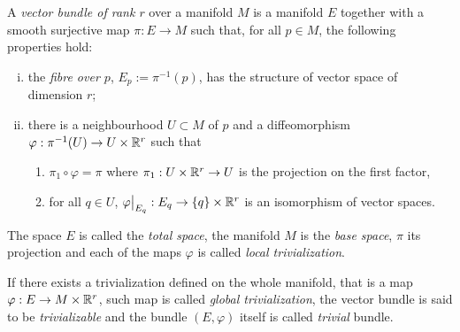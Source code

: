 \begin{definition}\label{def:vector_bundle}
	A \emph{vector bundle of rank $r$} over a manifold $M$ is a manifold $E$ together with a smooth surjective map $\pi : E \to M$ such that, for all $p\in M$, the following properties hold:
	\begin{enumerate}[(i)]
		\item the \emph{fibre over $p$}, $E_p := \pi^{-1}(p)$, has the structure of vector space of dimension $r$;
		\item there is a neighbourhood $U\subset M$ of $p$ and a diffeomorphism $\varphi: \pi^{-1}(U) \to U \times \mathbb{R}^r$ such that
		      \begin{enumerate}
			      \item $\pi_1 \circ \varphi = \pi$ where $\pi_1: U\times\mathbb{R}^r\to U$ is the projection on the first factor,
			      \item for all $q\in U$, $\varphi\big|_{E_q} : E_q \to \{q\}\times \mathbb{R}^r$ is an isomorphism of vector spaces.
		      \end{enumerate}
	\end{enumerate}

	The space $E$ is called the \emph{total space}, the manifold $M$ is the \emph{base space}, $\pi$ its projection and each of the maps $\varphi$ is called \emph{local trivialization}.

	If there exists a trivialization defined on the whole manifold, that is a map $\varphi: E \to M\times \mathbb{R}^r$, such map is called \emph{global trivialization}, the vector bundle is said to be \emph{trivializable} and the bundle $(E, \varphi)$ itself is called \emph{trivial} bundle.
\end{definition}

